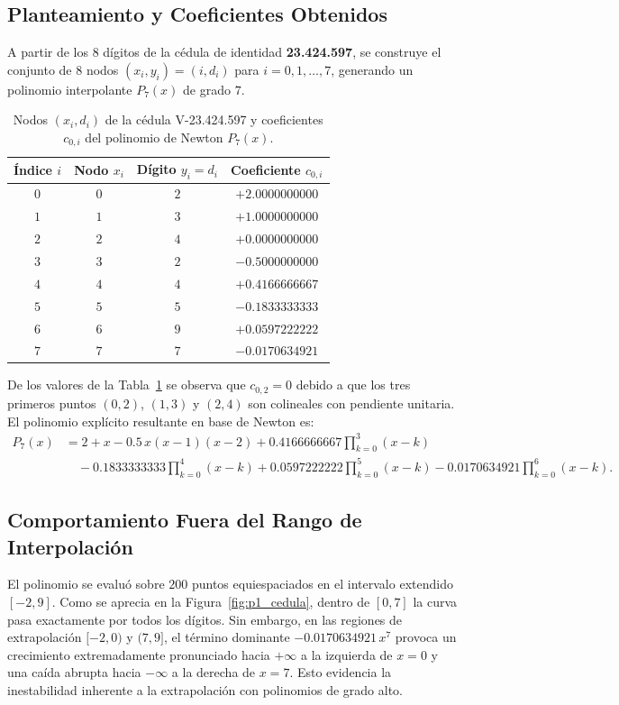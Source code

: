 \documentclass[11pt,letterpaper]{article}
\begin{document}
\subsection{Planteamiento y Coeficientes Obtenidos}
A partir de los $8$ dígitos de la cédula de identidad \textbf{23.424.597}, se construye el conjunto de $8$ nodos $(x_i, y_i) = (i, d_i)$ para $i = 0, 1, \dots, 7$, generando un polinomio interpolante $P_7(x)$ de grado $7$.

\begin{table}[H]
    \centering
    \caption{Nodos $(x_i, d_i)$ de la cédula V-23.424.597 y coeficientes $c_{0,i}$ del polinomio de Newton $P_7(x)$.}
    \label{tab:p1_cedula}
    \begin{tabular}{cccc}
        \toprule
        Índice $i$ & Nodo $x_i$ & Dígito $y_i = d_i$ & Coeficiente $c_{0,i}$ \\
        \midrule
        $0$ & $0$ & $2$ & $+2.0000000000$ \\
        $1$ & $1$ & $3$ & $+1.0000000000$ \\
        $2$ & $2$ & $4$ & $+0.0000000000$ \\
        $3$ & $3$ & $2$ & $-0.5000000000$ \\
        $4$ & $4$ & $4$ & $+0.4166666667$ \\
        $5$ & $5$ & $5$ & $-0.1833333333$ \\
        $6$ & $6$ & $9$ & $+0.0597222222$ \\
        $7$ & $7$ & $7$ & $-0.0170634921$ \\
        \bottomrule
    \end{tabular}
\end{table}

De los valores de la Tabla~\ref{tab:p1_cedula} se observa que $c_{0,2} = 0$ debido a que los tres primeros puntos $(0,2)$, $(1,3)$ y $(2,4)$ son colineales con pendiente unitaria. El polinomio explícito resultante en base de Newton es:
\begin{align}
    P_7(x) &= 2 + x - 0.5\,x(x-1)(x-2) + 0.4166666667\prod_{k=0}^{3}(x-k) \nonumber\\
           &\quad - 0.1833333333\prod_{k=0}^{4}(x-k) + 0.0597222222\prod_{k=0}^{5}(x-k) - 0.0170634921\prod_{k=0}^{6}(x-k).
\end{align}

\subsection{Comportamiento Fuera del Rango de Interpolación}
El polinomio se evaluó sobre $200$ puntos equiespaciados en el intervalo extendido $[-2, 9]$. Como se aprecia en la Figura~\ref{fig:p1_cedula}, dentro de $[0, 7]$ la curva pasa exactamente por todos los dígitos. Sin embargo, en las regiones de extrapolación $[-2, 0)$ y $(7, 9]$, el término dominante $-0.0170634921\,x^7$ provoca un crecimiento extremadamente pronunciado hacia $+\infty$ a la izquierda de $x=0$ y una caída abrupta hacia $-\infty$ a la derecha de $x=7$. Esto evidencia la inestabilidad inherente a la extrapolación con polinomios de grado alto.
\end{document}
